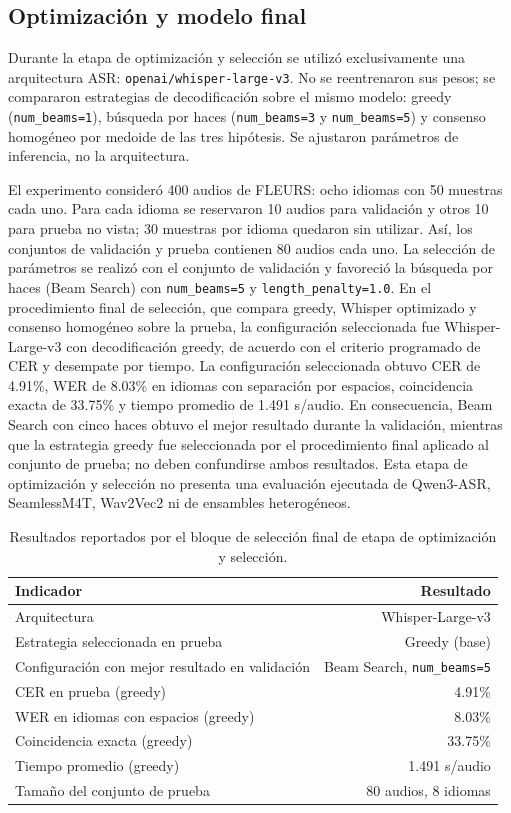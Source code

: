 \documentclass[11pt,letterpaper]{article}
\begin{document}
\subsection{Optimización y modelo final}
Durante la etapa de optimización y selección se utilizó exclusivamente una arquitectura ASR: \texttt{openai/whisper-large-v3}. No se reentrenaron sus pesos; se compararon estrategias de decodificación sobre el mismo modelo: greedy (\texttt{num\_beams=1}), búsqueda por haces (\texttt{num\_beams=3} y \texttt{num\_beams=5}) y consenso homogéneo por medoide de las tres hipótesis. Se ajustaron parámetros de inferencia, no la arquitectura.

El experimento consideró 400 audios de FLEURS: ocho idiomas con 50 muestras cada uno. Para cada idioma se reservaron 10 audios para validación y otros 10 para prueba no vista; 30 muestras por idioma quedaron sin utilizar. Así, los conjuntos de validación y prueba contienen 80 audios cada uno. La selección de parámetros se realizó con el conjunto de validación y favoreció la búsqueda por haces (Beam Search) con \texttt{num\_beams=5} y \texttt{length\_penalty=1.0}. En el procedimiento final de selección, que compara greedy, Whisper optimizado y consenso homogéneo sobre la prueba, la configuración seleccionada fue Whisper-Large-v3 con decodificación greedy, de acuerdo con el criterio programado de CER y desempate por tiempo. La configuración seleccionada obtuvo CER de 4.91\%, WER de 8.03\% en idiomas con separación por espacios, coincidencia exacta de 33.75\% y tiempo promedio de 1.491 s/audio. En consecuencia, Beam Search con cinco haces obtuvo el mejor resultado durante la validación, mientras que la estrategia greedy fue seleccionada por el procedimiento final aplicado al conjunto de prueba; no deben confundirse ambos resultados. Esta etapa de optimización y selección no presenta una evaluación ejecutada de Qwen3-ASR, SeamlessM4T, Wav2Vec2 ni de ensambles heterogéneos.

\begin{table}[H]\centering
\caption{Resultados reportados por el bloque de selección final de etapa de optimización y selección.}
\begin{tabularx}{\textwidth}{Xr}\toprule\textbf{Indicador} & \textbf{Resultado}\\\midrule
Arquitectura & Whisper-Large-v3\\
Estrategia seleccionada en prueba & Greedy (base)\\
Configuración con mejor resultado en validación & Beam Search, \texttt{num\_beams=5}\\
CER en prueba (greedy) & 4.91\%\\
WER en idiomas con espacios (greedy) & 8.03\%\\
Coincidencia exacta (greedy) & 33.75\%\\
Tiempo promedio (greedy) & 1.491 s/audio\\
Tamaño del conjunto de prueba & 80 audios, 8 idiomas\\\bottomrule\end{tabularx}\end{table}
\end{document}
